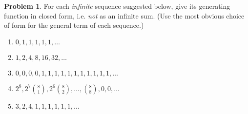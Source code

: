 \documentclass[12pt]{article}
\newcounter{chapternumber}
\theoremstyle{definition}
\newtheorem{problem-internal}{Problem}[chapternumber]
\newenvironment{problem}{
  \medskip
  \begin{problem-internal}
}{
\end{problem-internal}
}
\begin{document}
  \setcounter{chapternumber}{8}
  \setcounter{problem-internal}{1}
  \begin{problem}
    For each \textit{infinite} sequence suggested below, give its generating function in closed form, i.e. \textit{not} as an infinite sum.
    (Use the most obvious choice of form for the general term of each sequence.)
    \begin{enumerate}[label={\alph*.}]
      \item \(0, 1, 1, 1, 1, 1, \ldots\)
      \addtocounter{enumi}{1}
      \item \(1, 2, 4, 8, 16, 32, \ldots\)
      \item \(0, 0, 0, 0, 1, 1, 1, 1, 1, 1, 1, 1, 1, 1, 1, \ldots\)
      \addtocounter{enumi}{1}
      \item \(2^{8}, 2^{7} {8 \choose 1}, 2^{6} {8 \choose 2}, \ldots, {8 \choose 8}, 0, 0, \ldots\)
      \addtocounter{enumi}{2}
      \item \(3, 2, 4, 1, 1, 1, 1, 1, 1, \ldots\)
    \end{enumerate}
  \end{problem}
\end{document}
